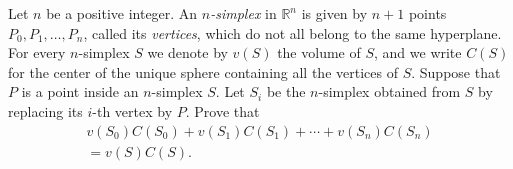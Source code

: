 \documentclass{article}
\begin{document}
\setlength{\parindent}{0pt}
Let $n$ be a positive integer. An $n$\emph{-simplex} in $\mathbb{R}^{n}$ is given by $n+1$ points $P_{0},P_{1},\dots,P_{n}$, called its \emph{vertices}, which do not all belong to the same hyperplane. For every $n$-simplex $S$ we denote by $v(S)$ the volume of $S$, and we write $C(S)$ for the center of the unique sphere containing all the vertices of $S$.\newline
Suppose that $P$ is a point inside an $n$-simplex $S$. Let $S_{i}$ be the $n$-simplex obtained from $S$ by replacing its $i$-th vertex by $P$. Prove that
\begin{multline*}
v(S_{0})C(S_{0})+v(S_{1})C(S_{1})+\cdots+v(S_{n})C(S_{n})\\=v(S)C(S).
\end{multline*}
\end{document}
